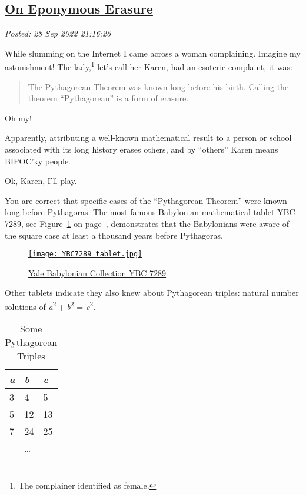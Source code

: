 %

\subsection*{\href{http://analyzethedatanotthedrivel.org/2022/09/28/on-eponymous-erasure/}{On Eponymous Erasure}}


\noindent\emph{Posted: 28 Sep 2022 21:16:26}
\vspace{6pt}

While slumming on the Internet I came across a woman complaining.
Imagine my astonishment! The
lady,\footnote{The complainer identified as female.}
let's call her Karen, had an esoteric complaint, it was:

\begin{quote}
The Pythagorean Theorem was known long before his birth. Calling the
theorem ``Pythagorean'' is a form of erasure.
\end{quote}

Oh my!

Apparently, attributing a well-known mathematical result to a person or
school associated with its long history erases others, and by
``others'' Karen means BIPOC'ky people.

Ok, Karen, I'll play.

You are correct that specific cases of the ``Pythagorean Theorem'' were
known long before Pythagoras. The most famous Babylonian mathematical
tablet YBC 7289, see Figure~\ref{fig:7510x0} on page~\pageref{fig:7510x0}, demonstrates that the Babylonians were aware
of the square case at least a thousand years before Pythagoras.

\captionsetup[figure]{labelformat=default}
\begin{figure}
\centering
\href{https://www.maa.org/press/periodicals/convergence/the-best-known-old-babylonian-tablet}{\texttt{[image: YBC7289\_tablet.jpg]}}
\caption{\href{https://isaw.nyu.edu/exhibitions/before-pythagoras/items/ybc-7289/}{Yale
Babylonian Collection YBC 7289}}
\label{fig:7510x0}
\end{figure}

Other tablets indicate they also knew about Pythagorean triples: natural
number solutions of {\emph{a}\textsuperscript{2} + \emph{b}\textsuperscript{2} = \emph{c}\textsuperscript{2}}.

\begin{longtable}[]{@{}lll@{}}
\toprule
\emph{a} & \emph{b} & \emph{c} \\
\midrule
\endhead
3 & 4 & 5 \\
5 & 12 & 13 \\
7 & 24 & 25 \\
& \ldots{} & \\
\bottomrule
\caption{Some Pythagorean Triples}
\label{tab:7510x0}
\end{longtable}

